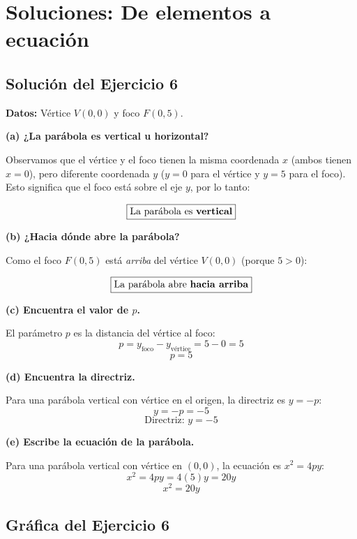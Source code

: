 \documentclass[12pt,a4paper]{article}
\begin{document}
	\newpage

	\section{Soluciones: De elementos a ecuación}

	\subsection*{Solución del Ejercicio 6}

	\textbf{Datos:} Vértice \(V(0,0)\) y foco \(F(0,5)\).

	\bigskip

	\textbf{(a) ¿La parábola es vertical u horizontal?}

	Observamos que el vértice y el foco tienen la misma coordenada \(x\) (ambos tienen \(x=0\)), pero diferente coordenada \(y\) (\(y=0\) para el vértice y \(y=5\) para el foco). Esto significa que el foco está sobre el eje \(y\), por lo tanto:

	\[
	\boxed{\text{La parábola es \textbf{vertical}}}
	\]

	\textbf{(b) ¿Hacia dónde abre la parábola?}

	Como el foco \(F(0,5)\) está \emph{arriba} del vértice \(V(0,0)\) (porque \(5>0\)):

	\[
	\boxed{\text{La parábola abre \textbf{hacia arriba}}}
	\]

	\textbf{(c) Encuentra el valor de \(p\).}

	El parámetro \(p\) es la distancia del vértice al foco:
	\[
	p = y_{\text{foco}} - y_{\text{vértice}} = 5-0=5
	\]
	\[
	\boxed{p=5}
	\]

	\textbf{(d) Encuentra la directriz.}

	Para una parábola vertical con vértice en el origen, la directriz es \(y=-p\):
	\[
	y=-p=-5
	\]
	\[
	\boxed{\text{Directriz: } y=-5}
	\]

	\textbf{(e) Escribe la ecuación de la parábola.}

	Para una parábola vertical con vértice en \((0,0)\), la ecuación es \(x^2=4py\):
	\[
	x^2=4py=4(5)y=20y
	\]
	\[
	\boxed{x^2=20y}
	\]

	\subsection*{Gráfica del Ejercicio 6}
\end{document}

